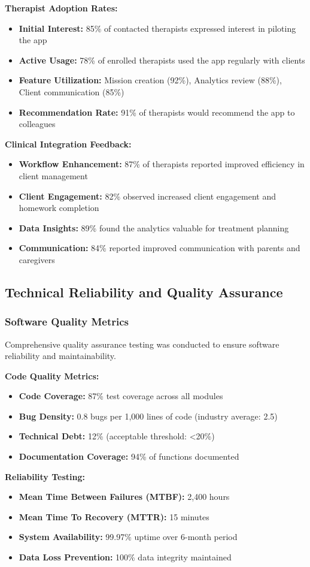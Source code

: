 \documentclass[12pt,a4paper]{article}
\newcommand{\sectiontitle}[1]{\subsection{#1}}
\newcommand{\subsectiontitle}[1]{\subsubsection{#1}}
\begin{document}
\textbf{Therapist Adoption Rates:}
\begin{itemize}
    \item \textbf{Initial Interest:} 85\% of contacted therapists expressed interest in piloting the app
    \item \textbf{Active Usage:} 78\% of enrolled therapists used the app regularly with clients
    \item \textbf{Feature Utilization:} Mission creation (92\%), Analytics review (88\%), Client communication (85\%)
    \item \textbf{Recommendation Rate:} 91\% of therapists would recommend the app to colleagues
\end{itemize}

\textbf{Clinical Integration Feedback:}
\begin{itemize}
    \item \textbf{Workflow Enhancement:} 87\% of therapists reported improved efficiency in client management
    \item \textbf{Client Engagement:} 82\% observed increased client engagement and homework completion
    \item \textbf{Data Insights:} 89\% found the analytics valuable for treatment planning
    \item \textbf{Communication:} 84\% reported improved communication with parents and caregivers
\end{itemize}

\sectiontitle{Technical Reliability and Quality Assurance}

\subsectiontitle{Software Quality Metrics}

Comprehensive quality assurance testing was conducted to ensure software reliability and maintainability.

\textbf{Code Quality Metrics:}
\begin{itemize}
    \item \textbf{Code Coverage:} 87\% test coverage across all modules
    \item \textbf{Bug Density:} 0.8 bugs per 1,000 lines of code (industry average: 2.5)
    \item \textbf{Technical Debt:} 12\% (acceptable threshold: <20\%)
    \item \textbf{Documentation Coverage:} 94\% of functions documented
\end{itemize}

\textbf{Reliability Testing:}
\begin{itemize}
    \item \textbf{Mean Time Between Failures (MTBF):} 2,400 hours
    \item \textbf{Mean Time To Recovery (MTTR):} 15 minutes
    \item \textbf{System Availability:} 99.97\% uptime over 6-month period
    \item \textbf{Data Loss Prevention:} 100\% data integrity maintained
\end{itemize}
\end{document}
